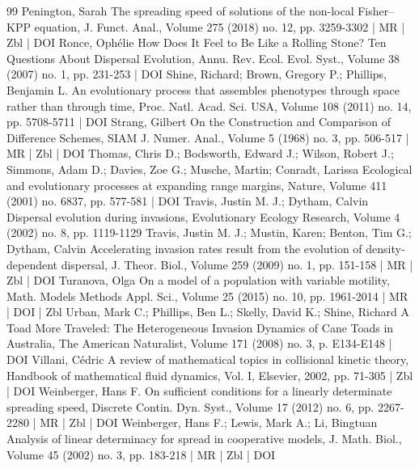 \documentclass[10pt]{amsart}
\theoremstyle{definition}\newtheorem{defi}[theo]{Definition}\newtheorem{rema}[theo]{Remark}\newtheorem{exam}[theo]{Example}\newtheorem{exem}[theo]{Example}\newtheorem{nota}[theo]{Notation}
\newcommand{\1}{\mathds{1}}
\begin{document}
\begin{thebibliography}{99}
Penington, Sarah The spreading speed of solutions of the non-local Fisher–KPP equation, J. Funct. Anal., Volume 275 (2018) no. 12, pp. 3259-3302 | MR | Zbl | DOI
Ronce, Ophélie How Does It Feel to Be Like a Rolling Stone? Ten Questions About Dispersal Evolution, Annu. Rev. Ecol. Evol. Syst., Volume 38 (2007) no. 1, pp. 231-253 | DOI
Shine, Richard; Brown, Gregory P.; Phillips, Benjamin L. An evolutionary process that assembles phenotypes through space rather than through time, Proc. Natl. Acad. Sci. USA, Volume 108 (2011) no. 14, pp. 5708-5711 | DOI
Strang, Gilbert On the Construction and Comparison of Difference Schemes, SIAM J. Numer. Anal., Volume 5 (1968) no. 3, pp. 506-517 | MR | Zbl | DOI
Thomas, Chris D.; Bodsworth, Edward J.; Wilson, Robert J.; Simmons, Adam D.; Davies, Zoe G.; Musche, Martin; Conradt, Larissa Ecological and evolutionary processes at expanding range margins, Nature, Volume 411 (2001) no. 6837, pp. 577-581 | DOI
Travis, Justin M. J.; Dytham, Calvin Dispersal evolution during invasions, Evolutionary Ecology Research, Volume 4 (2002) no. 8, pp. 1119-1129
Travis, Justin M. J.; Mustin, Karen; Benton, Tim G.; Dytham, Calvin Accelerating invasion rates result from the evolution of density-dependent dispersal, J. Theor. Biol., Volume 259 (2009) no. 1, pp. 151-158 | MR | Zbl | DOI
Turanova, Olga On a model of a population with variable motility, Math. Models Methods Appl. Sci., Volume 25 (2015) no. 10, pp. 1961-2014 | MR | DOI | Zbl
Urban, Mark C.; Phillips, Ben L.; Skelly, David K.; Shine, Richard A Toad More Traveled: The Heterogeneous Invasion Dynamics of Cane Toads in Australia, The American Naturalist, Volume 171 (2008) no. 3, p. E134-E148 | DOI
Villani, Cédric A review of mathematical topics in collisional kinetic theory, Handbook of mathematical fluid dynamics, Vol. I, Elsevier, 2002, pp. 71-305 | Zbl | DOI
Weinberger, Hans F. On sufficient conditions for a linearly determinate spreading speed, Discrete Contin. Dyn. Syst., Volume 17 (2012) no. 6, pp. 2267-2280 | MR | Zbl | DOI
Weinberger, Hans F.; Lewis, Mark A.; Li, Bingtuan Analysis of linear determinacy for spread in cooperative models, J. Math. Biol., Volume 45 (2002) no. 3, pp. 183-218 | MR | Zbl | DOI
\end{thebibliography}
\end{document}
